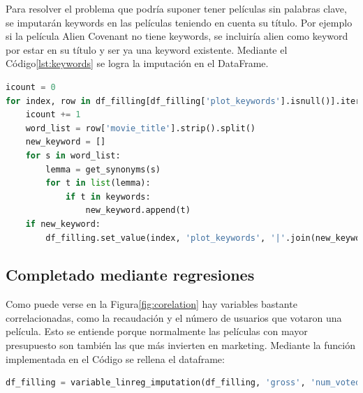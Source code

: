 Para resolver el problema que podría suponer tener películas sin palabras clave, se imputarán keywords en las películas teniendo en cuenta su título. Por ejemplo si la película Alien Covenant no tiene keywords, se incluiría alien como keyword por estar en su título y ser ya una keyword existente. Mediante el Código\ref{lst:keywords} se logra la imputación en el DataFrame.

\begin{lstlisting}[language=Python, caption=Imputación de keywords a partir del título de la película., label ={lst:keywords}]
icount = 0
for index, row in df_filling[df_filling['plot_keywords'].isnull()].iterrows():
    icount += 1
    word_list = row['movie_title'].strip().split()
    new_keyword = []
    for s in word_list:
        lemma = get_synonyms(s)
        for t in list(lemma):
            if t in keywords: 
                new_keyword.append(t)
    if new_keyword:
        df_filling.set_value(index, 'plot_keywords', '|'.join(new_keyword)) 
\end{lstlisting}

\subsection{Completado mediante regresiones}

Como puede verse en la Figura\ref{fig:corelation} hay variables bastante correlacionadas, como la recaudación y el número de usuarios que votaron una película. Esto se entiende porque normalmente las películas con mayor presupuesto son también las que más invierten en marketing. Mediante la función implementada en el Código se rellena el dataframe:

\begin{lstlisting}[language=Python, caption = Rellenado de la variable de presupuesto teniendo en cuenta el número de votos.]
df_filling = variable_linreg_imputation(df_filling, 'gross', 'num_voted_users')
\end{lstlisting}

